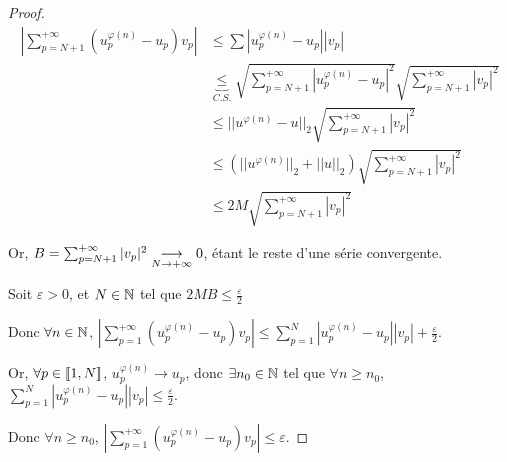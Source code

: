 \begin{proof}
    \begin{align*}
        \left| \sum_{p = N + 1}^{+ \infty} (u_p^{\varphi(n)} - u_p)v_p \right| &\leqslant \sum \left| u_p^{\varphi(n)} - u_p \right| |v_p| \\
        &\underbrace{\leqslant}_{C.S.} \sqrt{\sum_{p = N + 1}^{+ \infty } \left| u_p^{\varphi(n)} - u_p \right|^2} \sqrt{\sum_{p = N + 1}^{+ \infty} |v_p|^2} \\
        &\leqslant ||u^{\varphi(n)} - u||_2 \sqrt{\sum_{p = N + 1}^{+ \infty} |v_p|^2} \\
        &\leqslant (||u^{\varphi(n)}||_2 + ||u||_2) \sqrt{\sum_{p = N + 1}^{+ \infty} |v_p|^2} \\
        &\leqslant 2M \sqrt{\sum_{p = N + 1}^{+ \infty} |v_p|^2} 
    \end{align*}

    Or, $B = \sum_{p = N + 1}^{+ \infty} |v_p|^2 \underset{N \to + \infty}{\longrightarrow} 0$, étant le reste d'une série convergente.

    Soit $\varepsilon > 0$, et $N \in \mathbb{N}$ tel que $2M B \leqslant \frac \varepsilon 2$

    Donc $\forall n \in \mathbb{N}$, $\displaystyle \left| \sum_{p = 1}^{+ \infty} (u_p^{\varphi(n)} - u_p)v_p \right| \leqslant \sum_{p = 1 }^{N } |u_p^{\varphi(n)} - u_p| |v_p| + \frac \varepsilon 2$.

    Or, $\forall p \in [\![1, N]\!] $, $u_p^{\varphi(n)} \to u_p$, donc $\exists n_0 \in \mathbb{N}$ tel que $\forall n \geqslant n_0$, $\sum_{p = 1}^{N} |u_p^{\varphi(n)} - u_p| |v_p| \leqslant \frac \varepsilon 2$.

    Donc $\forall n \geqslant n_0$, $\left| \sum_{p = 1}^{+ \infty} (u_p^{\varphi(n)} - u_p)v_p \right| \leqslant \varepsilon$.
\end{proof}


